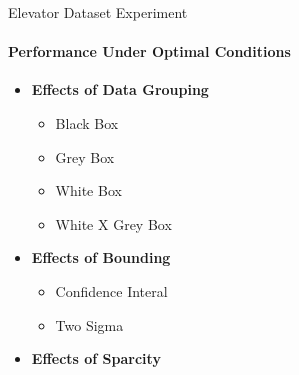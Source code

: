 \documentclass{beamer}
\begin{document}
\begin{frame}[t]{Elevator Dataset Experiment}
  \framesubtitle{Performance Under Optimal Conditions}
  \begin{itemize}
    \setlength\itemsep{1em}

  \item \textbf{Effects of Data Grouping}
    \begin{itemize}
      \item Black Box
      \item Grey Box
      \item White Box
      \item White X Grey Box
    \end{itemize}
  \item \textbf{Effects of Bounding}
    \begin{itemize}
      \item Confidence Interal
      \item Two Sigma
    \end{itemize}
  \item \textbf{Effects of Sparcity}
  \end{itemize}
\end{frame}
\end{document}
